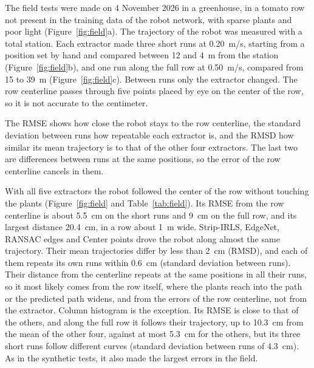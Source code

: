 \documentclass[10pt,a4paper]{article}
\begin{document}
The field tests were made on 4 November 2026 in a greenhouse, in a tomato row not present in the training data of the robot network, with sparse plants and poor light (Figure~\ref{fig:field}a). The trajectory of the robot was measured with a total station. Each extractor made three short runs at 0.20~m/s, starting from a position set by hand and compared between 12 and 4~m from the station (Figure~\ref{fig:field}b), and one run along the full row at 0.50~m/s, compared from 15 to 39~m (Figure~\ref{fig:field}c). Between runs only the extractor changed. The row centerline passes through five points placed by eye on the center of the row, so it is not accurate to the centimeter.

The RMSE shows how close the robot stays to the row centerline, the standard deviation between runs how repeatable each extractor is, and the RMSD how similar its mean trajectory is to that of the other four extractors. The last two are differences between runs at the same positions, so the error of the row centerline cancels in them.

With all five extractors the robot followed the center of the row without touching the plants (Figure~\ref{fig:field} and Table~\ref{tab:field}). Its RMSE from the row centerline is about 5.5~cm on the short runs and 9~cm on the full row, and its largest distance 20.4~cm, in a row about 1~m wide. Strip-IRLS, EdgeNet, RANSAC edges and Center points drove the robot along almost the same trajectory. Their mean trajectories differ by less than 2~cm (RMSD), and each of them repeats its own runs within 0.6~cm (standard deviation between runs). Their distance from the centerline repeats at the same positions in all their runs, so it most likely comes from the row itself, where the plants reach into the path or the predicted path widens, and from the errors of the row centerline, not from the extractor. Column histogram is the exception. Its RMSE is close to that of the others, and along the full row it follows their trajectory, up to 10.3~cm from the mean of the other four, against at most 5.3~cm for the others, but its three short runs follow different curves (standard deviation between runs of 4.3~cm). As in the synthetic tests, it also made the largest errors in the field.
\end{document}
